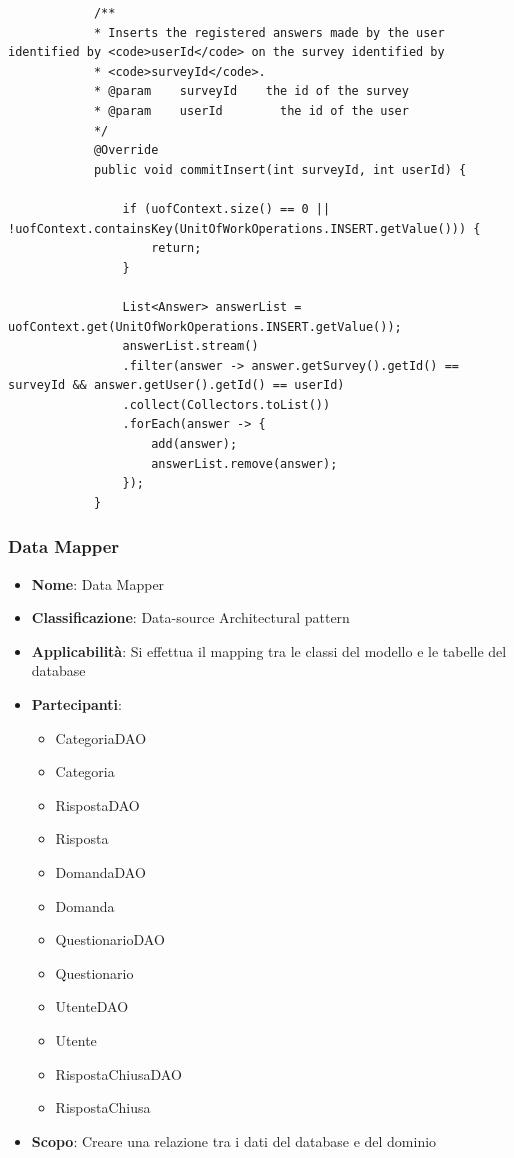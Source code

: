\documentclass[12pt]{article}
\begin{document}
\begin{itemize}
\begin{lstlisting}
			/**
			* Inserts the registered answers made by the user identified by <code>userId</code> on the survey identified by
			* <code>surveyId</code>.
			* @param    surveyId    the id of the survey
			* @param    userId        the id of the user
			*/
			@Override
			public void commitInsert(int surveyId, int userId) {
				
				if (uofContext.size() == 0 || !uofContext.containsKey(UnitOfWorkOperations.INSERT.getValue())) {
					return;
				}
				
				List<Answer> answerList = uofContext.get(UnitOfWorkOperations.INSERT.getValue());
				answerList.stream()
				.filter(answer -> answer.getSurvey().getId() == surveyId && answer.getUser().getId() == userId)
				.collect(Collectors.toList())
				.forEach(answer -> {
					add(answer);
					answerList.remove(answer);
				});
			}
		\end{lstlisting}
	\end{itemize}
	
	
	\subsubsection{Data Mapper}
	\begin{itemize}
		\item \textbf{Nome}: Data Mapper
		\item \textbf{Classificazione}: Data-source Architectural pattern
		\item \textbf{Applicabilità}: Si effettua il mapping tra le classi del modello e le tabelle del database
		\item \textbf{Partecipanti}:
		\begin{itemize}
			\item CategoriaDAO
			\item Categoria
			\item RispostaDAO
			\item Risposta
			\item DomandaDAO
			\item Domanda
			\item QuestionarioDAO
			\item Questionario
			\item UtenteDAO
			\item Utente
			\item RispostaChiusaDAO
			\item RispostaChiusa
		\end{itemize}
		\item \textbf{Scopo}: Creare una relazione tra i dati del database e del dominio
	\end{itemize}
	
\end{document}
